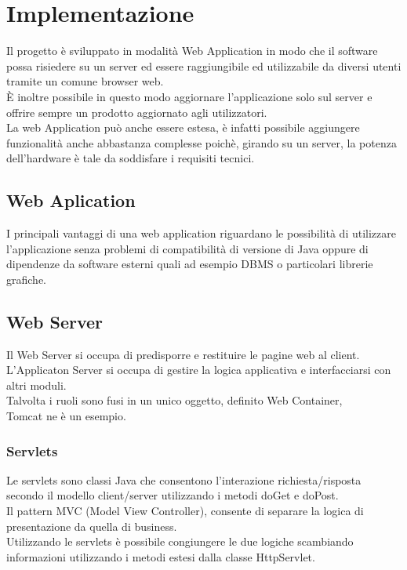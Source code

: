 \chapter{Implementazione} \label{cap2}
\def\baselinestretch{1.66}
Il progetto \`{e} sviluppato in modalit\`{a} Web Application in modo che il software possa risiedere su un server ed essere raggiungibile ed utilizzabile da diversi utenti tramite un comune browser web.\\
\`{E} inoltre possibile in questo modo aggiornare l'applicazione solo sul server e offrire sempre un prodotto aggiornato agli utilizzatori.\\
La web Application pu\`{o} anche essere estesa, \`{e} infatti possibile aggiungere funzionalit\`{a} anche abbastanza complesse poich\`{e}, girando su un server, la potenza dell'hardware \`{e} tale da soddisfare i requisiti tecnici.\\

\section{Web Aplication}
I principali vantaggi di una web application riguardano le possibilit\`{a} di utilizzare l'applicazione senza problemi di compatibilit\`{a} di versione di Java oppure di dipendenze da software esterni quali ad esempio DBMS o particolari librerie grafiche.\\
\section{Web Server}
Il Web Server si occupa di predisporre e restituire le pagine web al client.\\
L'Applicaton Server si occupa di gestire la logica applicativa e interfacciarsi con altri moduli. \\
Talvolta i ruoli sono fusi in un unico oggetto, definito Web Container,\\ Tomcat ne \`{e} un esempio.\\
\subsection{Servlets}
Le servlets sono classi Java che consentono l'interazione richiesta/risposta secondo il modello client/server utilizzando i metodi doGet e doPost.\\
Il pattern MVC (Model View Controller), consente di separare la logica di presentazione da quella di business.\\
Utilizzando le servlets \`{e} possibile congiungere le due logiche scambiando informazioni utilizzando i metodi estesi dalla classe HttpServlet.


